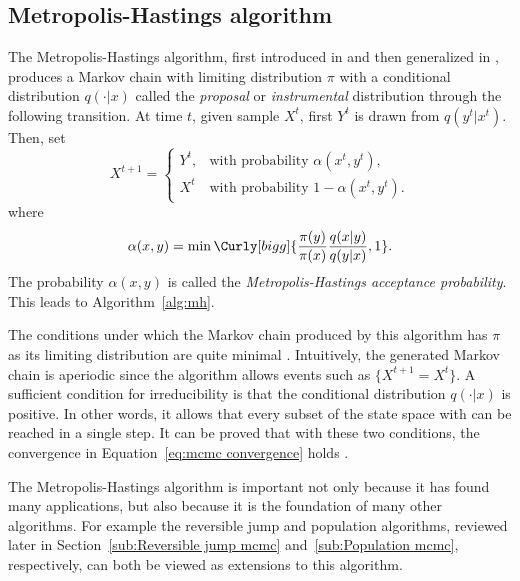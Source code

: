 \subsection{Metropolis-Hastings algorithm}
\label{sub:Metropolis-Hastings algorithm}

The Metropolis-Hastings algorithm, first introduced in \cite{Metropolis:1953ex} and then generalized in \cite{Hastings:1970gd}, produces a Markov chain with limiting distribution $\pi$ with a conditional distribution $q(\cdot|x)$ called the \emph{proposal} or \emph{instrumental} distribution through the following transition. At time $t$, given sample $X^t$, first $Y^t$ is drawn from $q(y^t|x^t)$. Then, set
\begin{equation*}
  X^{t+1} =
  \begin{cases}
    Y^t, &\text{with probability } \alpha(x^t,y^t),\\
    X^t  &\text{with probability } 1 - \alpha(x^t,y^t).
  \end{cases}
\end{equation*}
where
\begin{equation}
  \alpha(x,y) =
  \min\Curly[bigg]{\frac{\pi(y)}{\pi(x)}\frac{q(x|y)}{q(y|x)},1}.
\end{equation}
The probability $\alpha(x,y)$ is called the \emph{Metropolis-Hastings acceptance probability}. This leads to Algorithm~\ref{alg:mh}.



The conditions under which the Markov chain produced by this algorithm has $\pi$ as its limiting distribution are quite minimal \cite[][sec.~7.3.2]{Robert:2004tn}. Intuitively, the generated Markov chain is aperiodic since the algorithm allows events such as $\{X^{t+1} = X^t\}$. A sufficient condition for irreducibility is that the conditional distribution $q(\cdot|x)$ is positive. In other words, it allows that every subset of the state space with can be reached in a single step. It can be proved that with these two conditions, the convergence in Equation~\eqref{eq:mcmc convergence} holds \cite[][Theorem~7.4 and Corollary~7.5]{Robert:2004tn}.

The Metropolis-Hastings algorithm is important not only because it has found many applications, but also because it is the foundation of many other algorithms. For example the reversible jump \mcmc and population \mcmc algorithms, reviewed later in Section~\ref{sub:Reversible jump mcmc} and~\ref{sub:Population mcmc}, respectively, can both be viewed as extensions to this algorithm.

